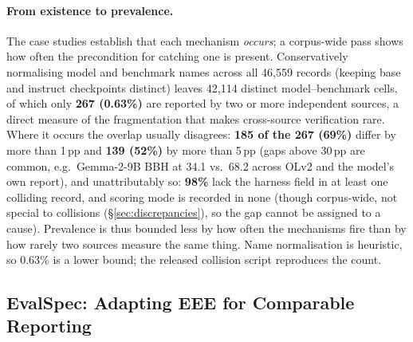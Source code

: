 \documentclass[11pt]{article}
\begin{document}
\paragraph{From existence to prevalence.}\label{sec:prevalence} The case studies
establish that each mechanism \emph{occurs}; a corpus-wide pass shows how often the
precondition for catching one is present. Conservatively normalising model
and benchmark names across all 46{,}559 records (keeping base and instruct
checkpoints distinct) leaves 42{,}114 distinct model--benchmark cells, of which
only \textbf{267 (0.63\%)} are reported by two or more independent sources, a
direct measure of the fragmentation that makes cross-source verification rare.
Where it occurs the overlap usually disagrees: \textbf{185 of the 267 (69\%)}
differ by more than 1\,pp and \textbf{139 (52\%)} by more than 5\,pp (gaps
above 30\,pp are common, e.g.\ Gemma-2-9B BBH at 34.1 vs.\ 68.2 across OLv2 and
the model's own report), and unattributably so: \textbf{98\%}
lack the harness field in at least one colliding record, and scoring
mode is recorded in none (though corpus-wide, not special to
collisions (\S\ref{sec:discrepancies}), so the gap cannot be assigned to a cause).
Prevalence is thus bounded less by how often the mechanisms fire than by how
rarely two sources measure the same thing. Name normalisation is heuristic,
so 0.63\% is a lower bound; the released collision script reproduces the count.

\subsection{EvalSpec: Adapting EEE for Comparable Reporting}
\label{sec:evalspec}
\end{document}
